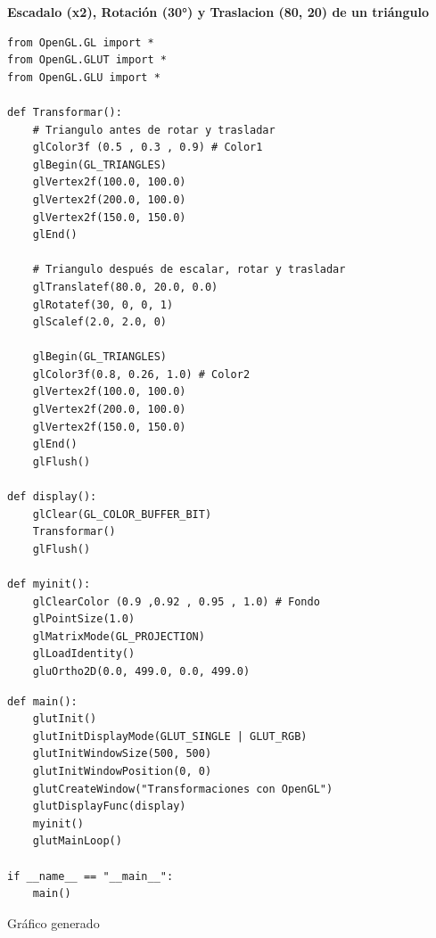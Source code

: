 \documentclass[a4paper]{article}
\begin{document}
\Large{\textbf{Escadalo (x2), Rotación (30°) y Traslacion (80, 20) de un triángulo}}\\[-0.4cm]
\begin{center}
\begin{mycodeboxl}
\begin{lstlisting}
from OpenGL.GL import *
from OpenGL.GLUT import *
from OpenGL.GLU import *

def Transformar():
    # Triangulo antes de rotar y trasladar
    glColor3f (0.5 , 0.3 , 0.9) # Color1
    glBegin(GL_TRIANGLES)
    glVertex2f(100.0, 100.0)
    glVertex2f(200.0, 100.0)
    glVertex2f(150.0, 150.0)
    glEnd()

    # Triangulo después de escalar, rotar y trasladar
    glTranslatef(80.0, 20.0, 0.0)
    glRotatef(30, 0, 0, 1)
    glScalef(2.0, 2.0, 0)

    glBegin(GL_TRIANGLES)
    glColor3f(0.8, 0.26, 1.0) # Color2
    glVertex2f(100.0, 100.0)
    glVertex2f(200.0, 100.0)
    glVertex2f(150.0, 150.0)
    glEnd()
    glFlush()

def display():
    glClear(GL_COLOR_BUFFER_BIT)
    Transformar()
    glFlush() 

def myinit():
    glClearColor (0.9 ,0.92 , 0.95 , 1.0) # Fondo
    glPointSize(1.0)
    glMatrixMode(GL_PROJECTION)
    glLoadIdentity() 
    gluOrtho2D(0.0, 499.0, 0.0, 499.0)
\end{lstlisting}
\end{mycodeboxl}
\end{center}
\begin{center}
\begin{mycodeboxl}
\begin{lstlisting}
def main():
    glutInit()
    glutInitDisplayMode(GLUT_SINGLE | GLUT_RGB)
    glutInitWindowSize(500, 500) 
    glutInitWindowPosition(0, 0)
    glutCreateWindow("Transformaciones con OpenGL")
    glutDisplayFunc(display)
    myinit()
    glutMainLoop()

if __name__ == "__main__":
    main()
\end{lstlisting}
\end{mycodeboxl}
\end{center}
Gráfico generado 
\end{document}
